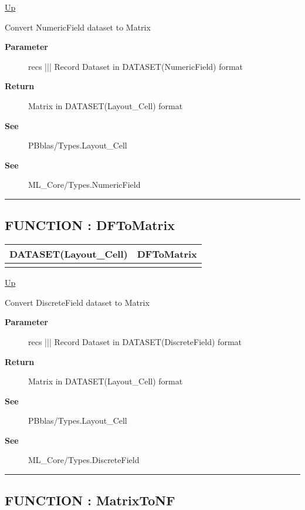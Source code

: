\hyperlink{ecldoc:PBblas.Converted}{Up}

\par
Convert NumericField dataset to Matrix

\par
\begin{description}
\item [\textbf{Parameter}] recs ||| Record Dataset in DATASET(NumericField) format
\item [\textbf{Return}] Matrix in DATASET(Layout\_Cell) format
\item [\textbf{See}] PBblas/Types.Layout\_Cell
\item [\textbf{See}] ML\_Core/Types.NumericField
\end{description}

\rule{\textwidth}{0.4pt}
\subsection*{FUNCTION : DFToMatrix}
\hypertarget{ecldoc:pbblas.converted.dftomatrix}{}

{\renewcommand{\arraystretch}{1.5}
\begin{tabularx}{\textwidth}{|>{\raggedright\arraybackslash}l|X|}
\hline
\hspace{0pt}DATASET(Layout\_Cell) & DFToMatrix \\
\hline
\multicolumn{2}{|>{\raggedright\arraybackslash}X|}{\hspace{0pt}(DATASET(DiscreteField) recs)} \\
\hline
\end{tabularx}
}

\hyperlink{ecldoc:PBblas.Converted}{Up}

\par
Convert DiscreteField dataset to Matrix

\par
\begin{description}
\item [\textbf{Parameter}] recs ||| Record Dataset in DATASET(DiscreteField) format
\item [\textbf{Return}] Matrix in DATASET(Layout\_Cell) format
\item [\textbf{See}] PBblas/Types.Layout\_Cell
\item [\textbf{See}] ML\_Core/Types.DiscreteField
\end{description}

\rule{\textwidth}{0.4pt}
\subsection*{FUNCTION : MatrixToNF}
\hypertarget{ecldoc:pbblas.converted.matrixtonf}{}

